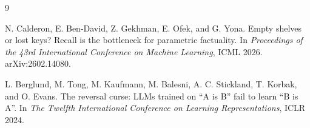 \documentclass[11pt]{article}
\begin{document}
\begin{thebibliography}{9}

N. Calderon, E. Ben-David, Z. Gekhman, E. Ofek, and G. Yona.
Empty shelves or lost keys? Recall is the bottleneck for parametric factuality.
In \textit{Proceedings of the 43rd International Conference on Machine Learning}, ICML 2026.
arXiv:2602.14080.

L. Berglund, M. Tong, M. Kaufmann, M. Balesni, A. C. Stickland, T. Korbak, and O. Evans.
The reversal curse: LLMs trained on ``A is B'' fail to learn ``B is A''.
In \textit{The Twelfth International Conference on Learning Representations}, ICLR 2024.

\end{thebibliography}
\end{document}
